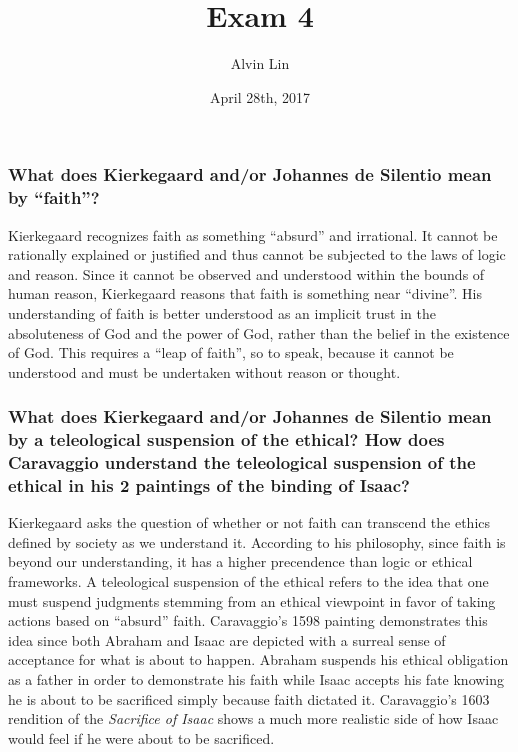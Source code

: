 \documentclass{article}
\title{Exam 4}
\author{Alvin Lin}
\date{April 28th, 2017}
\begin{document}
\maketitle

\subsubsection*{What does Kierkegaard and/or Johannes de Silentio mean by ``faith''?}
Kierkegaard recognizes faith as something ``absurd'' and irrational. It cannot be rationally explained or justified and thus cannot be subjected to the laws of logic and reason. Since it cannot be observed and understood within the bounds of human reason, Kierkegaard reasons that faith is something near ``divine''. His understanding of faith is better understood as an implicit trust in the absoluteness of God and the power of God, rather than the belief in the existence of God. This requires a ``leap of faith'', so to speak, because it cannot be understood and must be undertaken without reason or thought.

\subsubsection*{What does Kierkegaard and/or Johannes de Silentio mean by a teleological suspension of the ethical? How does Caravaggio understand the teleological suspension of the ethical in his 2 paintings of the binding of Isaac?}
Kierkegaard asks the question of whether or not faith can transcend the ethics defined by society as we understand it. According to his philosophy, since faith is beyond our understanding, it has a higher precendence than logic or ethical frameworks. A teleological suspension of the ethical refers to the idea that one must suspend judgments stemming from an ethical viewpoint in favor of taking actions based on ``absurd'' faith. Caravaggio's 1598 painting demonstrates this idea since both Abraham and Isaac are depicted with a surreal sense of acceptance for what is about to happen. Abraham suspends his ethical obligation as a father in order to demonstrate his faith while Isaac accepts his fate knowing he is about to be sacrificed simply because faith dictated it. Caravaggio's 1603 rendition of the \textit{Sacrifice of Isaac} shows a much more realistic side of how Isaac would feel if he were about to be sacrificed.
\end{document}
